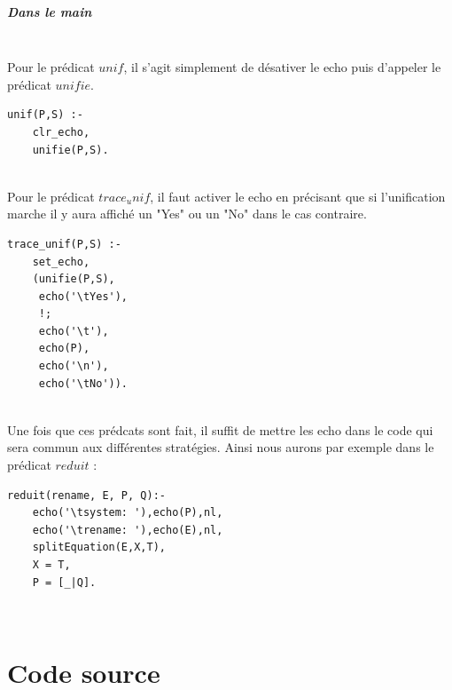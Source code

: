 \documentclass[10pt,a4paper]{report}
\begin{document}
\paragraph{Dans le main} ~\\
Pour le prédicat $unif$, il s'agit simplement de désativer le echo puis d'appeler le prédicat $unifie$.
\begin{lstlisting}[caption ={unif dans $main.pl$}]
unif(P,S) :-
	clr_echo,
	unifie(P,S).
\end{lstlisting} ~\\
Pour le prédicat $trace_unif$, il faut activer le echo en précisant que si l'unification marche il y aura affiché un "Yes" ou un "No" dans le cas contraire.
\begin{lstlisting}[caption ={trace unif dans $main.pl$}]
trace_unif(P,S) :-
	set_echo,
	(unifie(P,S),
	 echo('\tYes'),
	 !;
	 echo('\t'),
	 echo(P),
	 echo('\n'),
	 echo('\tNo')).
\end{lstlisting} ~\\
Une fois que ces prédcats sont fait, il suffit de mettre les echo dans le code qui sera commun aux différentes stratégies. Ainsi nous aurons par exemple dans le prédicat $reduit$ :
\begin{lstlisting}[caption ={Les echos dans $main.pl$}]
reduit(rename, E, P, Q):-
	echo('\tsystem: '),echo(P),nl,
	echo('\trename: '),echo(E),nl,
	splitEquation(E,X,T),
	X = T,
	P = [_|Q].
\end{lstlisting} ~\\






\mbox{}
\newpage
\chapter*{Code source}
\end{document}
